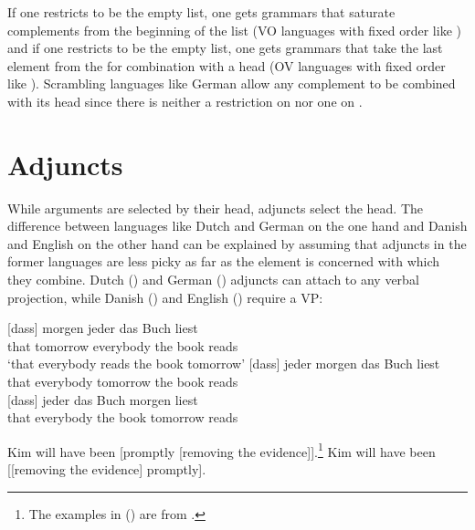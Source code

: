 If one restricts  to be the
empty list, one gets grammars that saturate complements from the beginning of the list (VO languages
with fixed order like ) and if one restricts  to be the empty list, one gets grammars that take the last
element from the \compsl for combination with a head (OV languages with fixed order like
). Scrambling languages like German allow any
complement to be combined with its head since there is neither a restriction on  nor one on .





\section{Adjuncts}

While arguments are selected by their head, adjuncts select the head. The difference between
languages like Dutch and German on the one hand and Danish and English on the other hand can be
explained by assuming that adjuncts in the former languages are less picky as far as the element is
concerned with which they combine. Dutch () and German ()
adjuncts can attach to any verbal projection, while Danish () and English () require a VP:

\eal
\ex \dutch
\ex
\zl

\eal
\ex
\label{ex-m-j-b-l} 
\gll {}[dass] morgen jeder das Buch liest\\
     \spacebr{}that tomorrow everybody the book reads\\\german
\glt `that everybody reads the book tomorrow'
\ex
\label{ex-j-m-b-l} 
\gll {}[dass] jeder morgen das Buch liest\\
     \spacebr{}that everybody tomorrow the book reads\\ 
\ex
\label{ex-j-b-m-l}
\gll {}[dass] jeder das Buch morgen liest\\
    \spacebr{}that everybody the book tomorrow reads\\
\zl


\eal
\ex \danish
\ex
\zl

\eal
\ex Kim will have been [promptly [removing the evidence]].\footnote{
  The examples in () are from .}
\ex Kim will have been [[removing the evidence] promptly].
\zl

